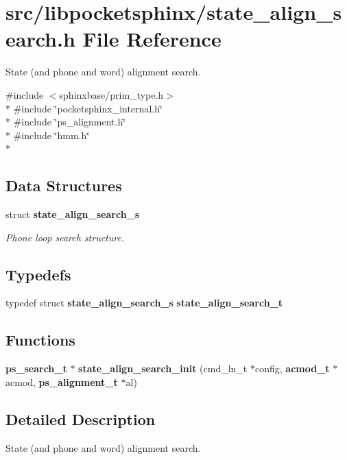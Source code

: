 \section{src/libpocketsphinx/state\+\_\+align\+\_\+search.h File Reference}
\label{state__align__search_8h}


State (and phone and word) alignment search.  


{\ttfamily \#include $<$sphinxbase/prim\+\_\+type.\+h$>$}\\*
{\ttfamily \#include \char`\"{}pocketsphinx\+\_\+internal.\+h\char`\"{}}\\*
{\ttfamily \#include \char`\"{}ps\+\_\+alignment.\+h\char`\"{}}\\*
{\ttfamily \#include \char`\"{}hmm.\+h\char`\"{}}\\*
\subsection*{Data Structures}
\begin{DoxyCompactItemize}
\item 
struct {\bf state\+\_\+align\+\_\+search\+\_\+s}
\begin{DoxyCompactList}\small\item\em Phone loop search structure. \end{DoxyCompactList}\end{DoxyCompactItemize}
\subsection*{Typedefs}
\begin{DoxyCompactItemize}
\item 
typedef struct {\bf state\+\_\+align\+\_\+search\+\_\+s} {\bfseries state\+\_\+align\+\_\+search\+\_\+t}\label{state__align__search_8h_a4559ae74ee038260ff66f432a7205aa8}

\end{DoxyCompactItemize}
\subsection*{Functions}
\begin{DoxyCompactItemize}
\item 
{\bf ps\+\_\+search\+\_\+t} $\ast$ {\bfseries state\+\_\+align\+\_\+search\+\_\+init} (cmd\+\_\+ln\+\_\+t $\ast$config, {\bf acmod\+\_\+t} $\ast$acmod, {\bf ps\+\_\+alignment\+\_\+t} $\ast$al)\label{state__align__search_8h_a7263b71e3838f0689963439c8b695e15}

\end{DoxyCompactItemize}


\subsection{Detailed Description}
State (and phone and word) alignment search. 

